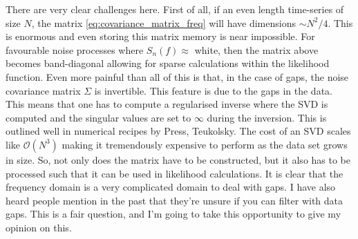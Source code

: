\documentclass{article}
\begin{document}
There are very clear challenges here. First of all, if an even length time-series of size $N$, the matrix \eqref{eq:covariance_matrix_freq} will have dimensions $\sim N^2 / 4$. This is enormous and even storing this matrix memory is near impossible. For favourable noise processes where $S_{n}(f) \approx$ white, then the matrix above becomes band-diagonal allowing for sparse calculations within the likelihood function. Even more painful than all of this is that, in the case of gaps, the noise covariance matrix $\Sigma$ is invertible. This feature is due to the gaps in the data. This means that one has to compute a regularised inverse where the SVD is computed and the singular values are set to $\infty$ during the inversion. This is outlined well in numerical recipes by Press, Teukolsky. The cost of an SVD scales like $\mathcal{O}(N^3)$ making it tremendously expensive to perform as the data set grows in size. So, not only does the matrix have to be constructed, but it also has to be processed such that it can be used in likelihood calculations. It is clear that the frequency domain is a very complicated domain to deal with gaps. I have also heard people mention in the past that they're unsure if you can filter with data gaps. This is a fair question, and I'm going to take this opportunity to give my opinion on this. 
\end{document}
